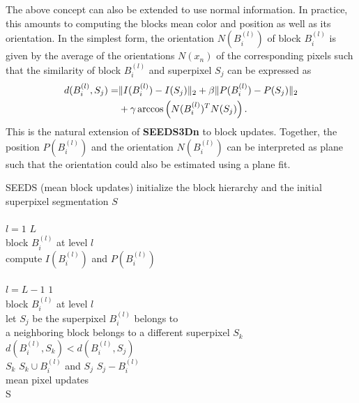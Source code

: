 The above concept can also be extended to use normal information. In practice, this amounts to computing the blocks mean color and position as well as its orientation. In the simplest form, the orientation $N(B_i^{(l)})$ of block $B_i^{(l)}$ is given by the average of the orientations $N(x_n)$ of the corresponding pixels such that the similarity of block $B_i^{(l)}$ and superpixel $S_j$ can be expressed as
\begin{align}
	d(B_i^{(l)}, S_j) = &\|I(B_i^{(l)}) - I(S_j)\|_2 + \beta\|P(B_i^{(l)}) - P(S_j)\|_2\notag\\
	& + \gamma \arccos \left(N(B_i^{(l)})^T N(S_j) \right).
\end{align}
This is the natural extension of \textbf{SEEDS3Dn} to block updates. Together, the position $P(B_i^{(l)})$ and the orientation $N(B_i^{(l)})$ can be interpreted as plane such that the orientation could also be estimated using a plane fit.
\begin{algorithm}[t]
	\begin{algo}{SEEDS (mean block updates)}{\label{algo:seeds-depth-mean-block-updates}}
		initialize the block hierarchy and the initial superpixel segmentation $S$\\
		\\
		\qfor $l = 1$ \qto $L$\\
			\qforeach block $B_i^{(l)}$ at level $l$ \\ 
				compute $I(B_i^{(l)})$ and $P(B_i^{(l)})$\qrof\qrof\\
		\\
		\qfor $l = L - 1$ \qto $1$\\
			\qforeach block $B_i^{(l)}$ at level $l$\\
				let $S_j$ be the superpixel $B_i^{(l)}$ belongs to\\
				\qif a neighboring block belongs to a different superpixel $S_k$\\
					\qthen \qif $d(B_i^{(l)}, S_k) < d(B_i^{(l)}, S_j)$\\
						\qthen $S_k$ \qlet $S_k \cup B_i^{(l)}$ and $S_j$ \qlet $S_j - B_i^{(l)}$\qfi\qfi\qrof\qrof\\
		mean pixel updates \\
		\qreturn S
	\end{algo}
	\caption[\textbf{SEEDS} \cite{VanDenBerghBoixRoigCapitaniVanGool:2012} based on mean block updates using 3D point coordinates.]{After defining a distance $d(B_i^{(l)}, S_j)$ between blocks and superpixels based on their respective centers, block updates can be performed without relying on color histograms. Of course, both approaches can also be combined resulting in a higher runtime}
	\label{fig:seeds-depth-mean-block-updates}
\end{algorithm}

